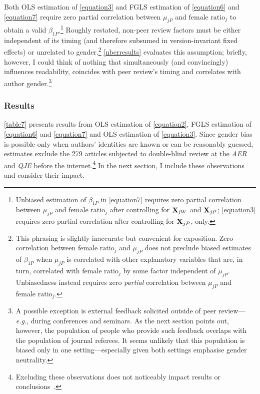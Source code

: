 Both OLS estimation of \autoref{equation3} and FGLS estimation of \autoref{equation6} and \autoref{equation7} require zero partial correlation between $\mu_{jP}$ and $\text{female ratio}_j$ to obtain a valid $\beta_{1P}$.\footnote{Unbiased estimation of $\beta_{1P}$ in \autoref{equation7} requires zero partial correlation between $\mu_{jP}$ and $\text{female ratio}_j$ after controlling for $\mathbf{X}_{jW}$ and $\mathbf{X}_{jP}$; \autoref{equation3} requires zero partial correlation after controlling for $\mathbf{X}_{jP}$, only.} Roughly restated, non-peer review factors must be either independent of its timing (and therefore subsumed in version-invariant fixed effects) or unrelated to gender.\footnote{\label{footnote46}This phrasing is slightly inaccurate but convenient for exposition. Zero correlation between $\text{female ratio}_j$ and $\mu_{jP}$ does not preclude biased estimates of $\beta_{1P}$ when $\mu_{jP}$ is correlated with other explanatory variables that are, in turn, correlated with $\text{female ratio}_j$ by some factor independent of $\mu_{jP}$. Unbiasedness instead requires zero \emph{partial} correlation between $\mu_{jP}$ and $\text{female ratio}_j$.} \autoref{nberresults} evaluates this assumption; briefly, however, I could think of nothing that simultaneously (and convincingly) influences readability, coincides with peer review's timing and correlates with author gender.\footnote{A possible exception is external feedback solicited outside of peer review---\emph{e.g.}, during conferences and seminars. As the next section points out, however, the population of people who provide such feedback overlaps with the population of journal referees. It seems unlikely that this population is biased only in one setting---especially given both settings emphasise gender neutrality.} 

\subsubsection{Results}
\label{nberresults}

\autoref{table7} presents results from OLS estimation of \autoref{equation2}, FGLS estimation of \autoref{equation6} and \autoref{equation7} and OLS estimation of \autoref{equation3}. Since gender bias is possible only when authors' identities are known or can be reasonably guessed, estimates exclude the 279 articles subjected to double-blind review at the \emph{AER} and \emph{QJE} before the internet.\footnote{\label{Footnote51}Excluding these observations does not noticeably impact results or conclusions~\citep[for estimates based on the full sample, see][p. 18]{Hengel2016}.} In the next section, I include these observations and consider their impact.


